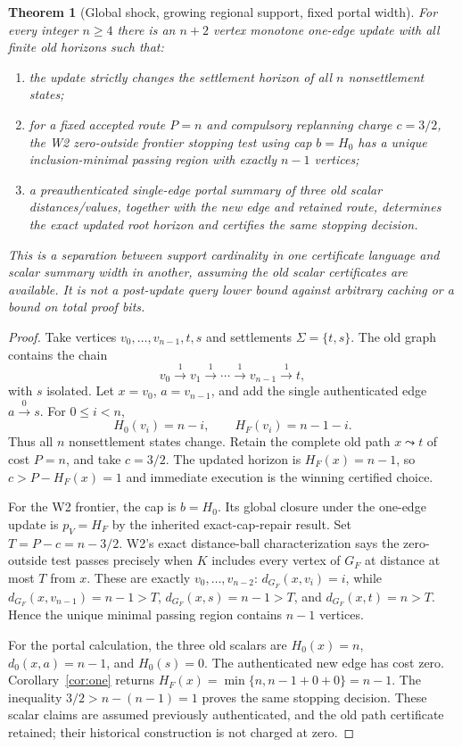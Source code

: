 \documentclass[11pt,letterpaper]{article}
\newtheorem{theorem}{Theorem}[section]
\begin{document}
\begin{theorem}[Global shock, growing regional support, fixed portal width]\label{thm:separate}
For every integer $n\ge4$ there is an $n+2$ vertex monotone one-edge update with all finite old horizons such that:
\begin{enumerate}[label=(\roman*)]
\item the update strictly changes the settlement horizon of all $n$ nonsettlement states;
\item for a fixed accepted route $P=n$ and compulsory replanning charge $c=3/2$, the W2 zero-outside frontier stopping test using cap $b=H_0$ has a unique inclusion-minimal passing region with exactly $n-1$ vertices;
\item a preauthenticated single-edge portal summary of three old scalar distances/values, together with the new edge and retained route, determines the exact updated root horizon and certifies the same stopping decision.
\end{enumerate}
This is a separation between \emph{support cardinality in one certificate language} and \emph{scalar summary width in another}, assuming the old scalar certificates are available. It is not a post-update query lower bound against arbitrary caching or a bound on total proof bits.
\end{theorem}
\begin{proof}
Take vertices $v_0,\ldots,v_{n-1},t,s$ and settlements $\Sigma=\{t,s\}$. The old graph contains the chain
\[
v_0\xrightarrow{1}v_1\xrightarrow{1}\cdots\xrightarrow{1}v_{n-1}\xrightarrow{1}t,
\]
with $s$ isolated. Let $x=v_0$, $a=v_{n-1}$, and add the single authenticated edge $a\xrightarrow{0}s$. For $0\le i<n$,
\[
H_0(v_i)=n-i,\qquad H_F(v_i)=n-1-i.
\]
Thus all $n$ nonsettlement states change. Retain the complete old path $x\leadsto t$ of cost $P=n$, and take $c=3/2$. The updated horizon is $H_F(x)=n-1$, so $c>P-H_F(x)=1$ and immediate execution is the winning certified choice.

For the W2 frontier, the cap is $b=H_0$. Its global closure under the one-edge update is $p_V=H_F$ by the inherited exact-cap-repair result. Set $T=P-c=n-3/2$. W2's exact distance-ball characterization says the zero-outside test passes precisely when $K$ includes every vertex of $G_F$ at distance at most $T$ from $x$. These are exactly $v_0,\ldots,v_{n-2}$: $d_{G_F}(x,v_i)=i$, while $d_{G_F}(x,v_{n-1})=n-1>T$, $d_{G_F}(x,s)=n-1>T$, and $d_{G_F}(x,t)=n>T$. Hence the unique minimal passing region contains $n-1$ vertices.

For the portal calculation, the three old scalars are $H_0(x)=n$, $d_0(x,a)=n-1$, and $H_0(s)=0$. The authenticated new edge has cost zero. Corollary~\ref{cor:one} returns $H_F(x)=\min\{n,n-1+0+0\}=n-1$. The inequality $3/2>n-(n-1)=1$ proves the same stopping decision. These scalar claims are assumed previously authenticated, and the old path certificate retained; their historical construction is not charged at zero.
\end{proof}
\end{document}
